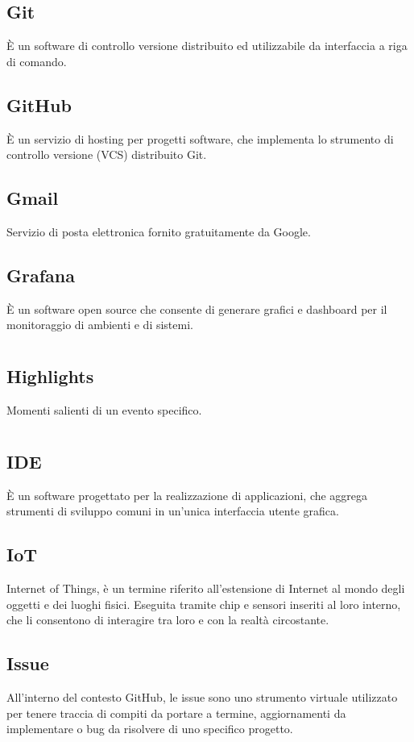 	\subsection*{Git}
	È un software di controllo versione distribuito ed utilizzabile da interfaccia a riga di comando.
	\subsection*{GitHub}
	È un servizio di hosting per progetti software, che implementa lo strumento di controllo versione (VCS) distribuito Git.
	\subsection*{Gmail}
	Servizio di posta elettronica fornito gratuitamente da Google.
	\subsection*{Grafana}
	È un software open source che consente di generare grafici e dashboard per il monitoraggio di ambienti e di sistemi.
\pagebreak
\section{}
	\subsection*{Highlights}
	Momenti salienti di un evento specifico. 
\pagebreak
\section{}
	\subsection*{IDE}
	È un software progettato per la realizzazione di applicazioni, che aggrega strumenti di sviluppo comuni in un’unica interfaccia utente grafica.
	\subsection*{IoT}
	Internet of Things, è un termine riferito all’estensione di Internet al mondo degli oggetti e dei luoghi fisici. Eseguita tramite chip e sensori inseriti al loro interno, che li consentono di interagire tra loro e con la realtà circostante.
	\subsection*{Issue}
	All'interno del contesto GitHub, le issue sono uno strumento virtuale utilizzato per tenere traccia di compiti da portare a termine, aggiornamenti da implementare o bug da risolvere di uno specifico progetto.
\pagebreak
